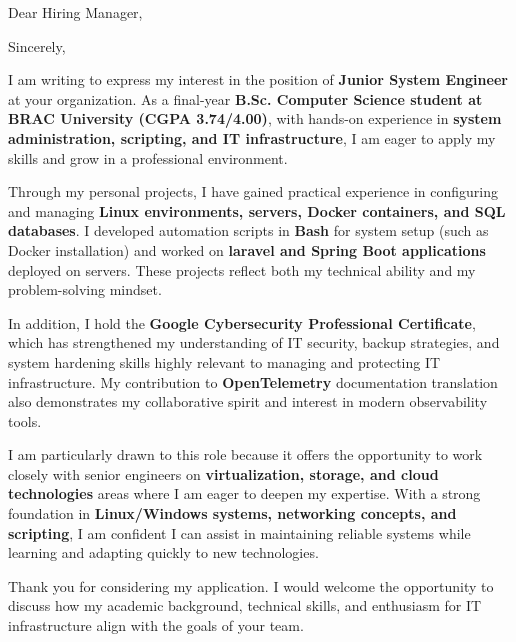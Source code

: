 \documentclass[11pt,a4paper,roman]{moderncv}        %
\begin{document}
\date{12/09/2025}
\opening{Dear Hiring Manager,}
\closing{Sincerely,}
\makelettertitle

I am writing to express my interest in the position of \textbf{Junior System Engineer} at your organization. As a final-year \textbf{B.Sc. Computer Science student at BRAC University (CGPA 3.74/4.00)}, with hands-on experience in \textbf{system administration, scripting, and IT infrastructure}, I am eager to apply my skills and grow in a professional environment.

Through my personal projects, I have gained practical experience in configuring and managing \textbf{Linux environments, servers, Docker containers, and SQL databases}. I developed automation scripts in \textbf{Bash} for system setup (such as Docker installation) and worked on \textbf{laravel and Spring Boot applications} deployed on servers. These projects reflect both my technical ability and my problem-solving mindset.

In addition, I hold the \textbf{Google Cybersecurity Professional Certificate}, which has strengthened my understanding of IT security, backup strategies, and system hardening skills highly relevant to managing and protecting IT infrastructure. My contribution to \textbf{OpenTelemetry} documentation translation also demonstrates my collaborative spirit and interest in modern observability tools.

I am particularly drawn to this role because it offers the opportunity to work closely with senior engineers on \textbf{virtualization, storage, and cloud technologies} areas where I am eager to deepen my expertise. With a strong foundation in \textbf{Linux/Windows systems, networking concepts, and scripting}, I am confident I can assist in maintaining reliable systems while learning and adapting quickly to new technologies.

Thank you for considering my application. I would welcome the opportunity to discuss how my academic background, technical skills, and enthusiasm for IT infrastructure align with the goals of your team.

\makeletterclosing
\end{document}
